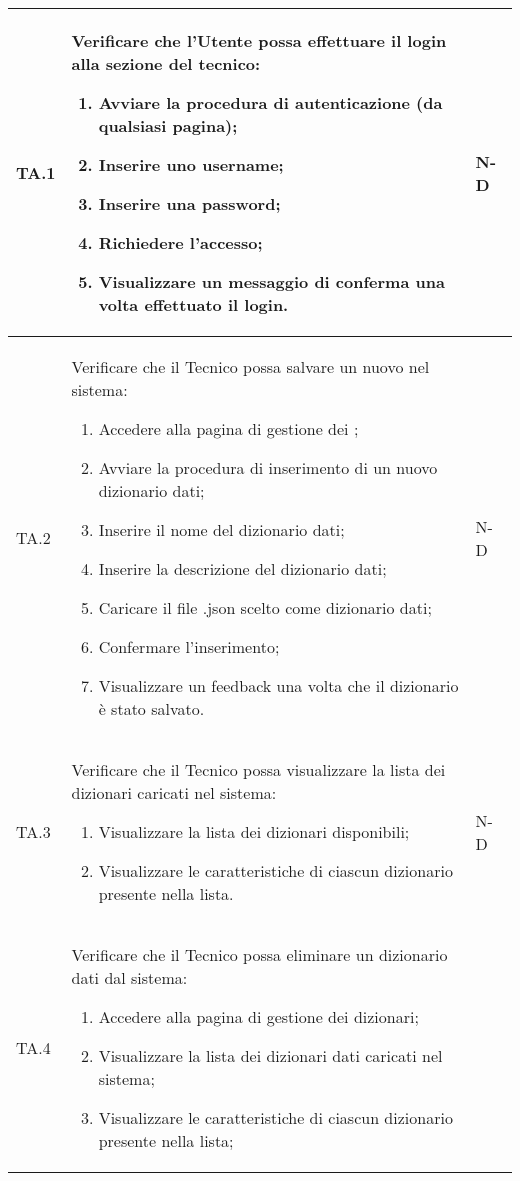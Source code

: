 \begin{adjustwidth}{-0.5cm}{-0.5cm}
\begin{longtable}{|P{1.5cm}|>{\raggedright}P{9.5cm}|>{\arraybackslash}P{1.5cm}|}
		TA.1 & Verificare che l'Utente possa effettuare il login alla sezione del tecnico:
		\begin{enumerate}
			\item Avviare la procedura di autenticazione (da qualsiasi pagina);
			\item Inserire uno username;
			\item Inserire una password;
			\item Richiedere l'accesso;
			\item Visualizzare un messaggio di conferma una volta effettuato il login.
		\end{enumerate}
		& N-D \\
		\hline TA.2 & Verificare che il Tecnico possa salvare un nuovo  nel sistema:
		\begin{enumerate}
			\item Accedere alla pagina di gestione dei ;
			\item Avviare la procedura di inserimento di un nuovo dizionario dati;
			\item Inserire il nome del dizionario dati;
			\item Inserire la descrizione del dizionario dati;
			\item Caricare il file .json scelto come dizionario dati;
			\item Confermare l'inserimento;
			\item Visualizzare un feedback una volta che il dizionario è stato salvato.
		\end{enumerate}
		& N-D \\
		\hline TA.3 & Verificare che il Tecnico possa visualizzare la lista dei dizionari caricati nel sistema:
		\begin{enumerate}
			\item Visualizzare la lista dei dizionari disponibili;
			\item Visualizzare le caratteristiche di ciascun dizionario presente nella lista.
		\end{enumerate}
		& N-D \\
		\hline TA.4 & Verificare che il Tecnico possa eliminare un dizionario dati dal sistema:
		\begin{enumerate}
			\item Accedere alla pagina di gestione dei dizionari;
			\item Visualizzare la lista dei dizionari dati caricati nel sistema;
			\item Visualizzare le caratteristiche di ciascun dizionario presente nella lista;

\end{enumerate}
\end{longtable}
\end{adjustwidth}
